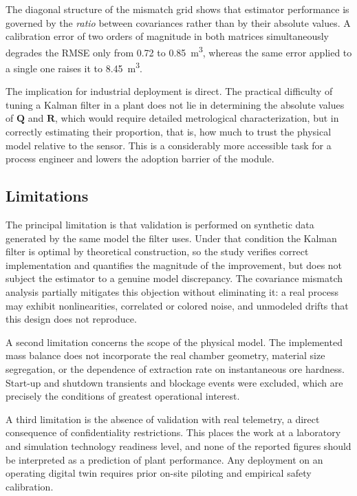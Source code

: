 \documentclass[conference]{IEEEtran}
\begin{document}
The diagonal structure of the mismatch grid shows that estimator performance is
governed by the \emph{ratio} between covariances rather than by their absolute
values. A calibration error of two orders of magnitude in both matrices
simultaneously degrades the RMSE only from 0.72 to 0.85~m\textsuperscript{3},
whereas the same error applied to a single one raises it to
8.45~m\textsuperscript{3}.

The implication for industrial deployment is direct. The practical difficulty of
tuning a Kalman filter in a plant does not lie in determining the absolute
values of $\mathbf{Q}$ and $\mathbf{R}$, which would require detailed
metrological characterization, but in correctly estimating their proportion,
that is, how much to trust the physical model relative to the sensor. This is a
considerably more accessible task for a process engineer and lowers the adoption
barrier of the module.

\subsection{Limitations}

The principal limitation is that validation is performed on synthetic data
generated by the same model the filter uses. Under that condition the Kalman
filter is optimal by theoretical construction, so the study verifies correct
implementation and quantifies the magnitude of the improvement, but does not
subject the estimator to a genuine model discrepancy. The covariance mismatch
analysis partially mitigates this objection without eliminating it: a real
process may exhibit nonlinearities, correlated or colored noise, and unmodeled
drifts that this design does not reproduce.

A second limitation concerns the scope of the physical model. The implemented
mass balance does not incorporate the real chamber geometry, material size
segregation, or the dependence of extraction rate on instantaneous ore hardness.
Start-up and shutdown transients and blockage events were excluded, which are
precisely the conditions of greatest operational interest.

A third limitation is the absence of validation with real telemetry, a direct
consequence of confidentiality restrictions. This places the work at a
laboratory and simulation technology readiness level, and none of the reported
figures should be interpreted as a prediction of plant performance. Any
deployment on an operating digital twin requires prior on-site piloting and
empirical safety calibration.
\end{document}
